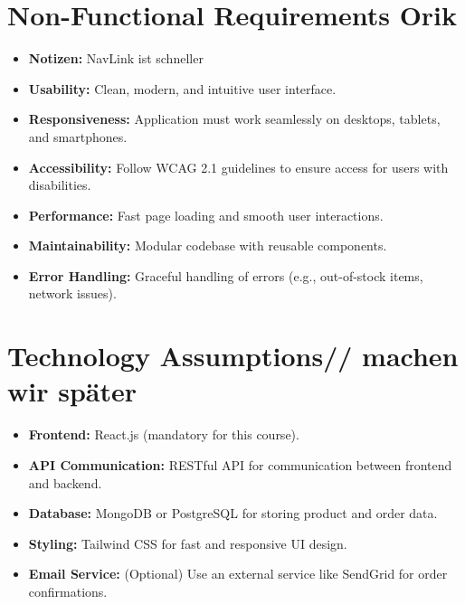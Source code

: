 \documentclass[a4paper,12pt]{article.cls}
\begin{document}
	\section{Non-Functional Requirements Orik}
	\begin{itemize}
			\item \textbf{Notizen:} NavLink ist schneller
		\item \textbf{Usability:} Clean, modern, and intuitive user interface.
		\item \textbf{Responsiveness:} Application must work seamlessly on desktops, tablets, and smartphones.
		\item \textbf{Accessibility:} Follow WCAG 2.1 guidelines to ensure access for users with disabilities.
		\item \textbf{Performance:} Fast page loading and smooth user interactions.
		\item \textbf{Maintainability:} Modular codebase with reusable components.
		\item \textbf{Error Handling:} Graceful handling of errors (e.g., out-of-stock items, network issues).
	\end{itemize}
	
	\section{Technology Assumptions// machen wir später}
	\begin{itemize}
		\item \textbf{Frontend:} React.js (mandatory for this course).
	
		\item \textbf{API Communication:} RESTful API for communication between frontend and backend.
		\item \textbf{Database:} MongoDB or PostgreSQL for storing product and order data.
		\item \textbf{Styling:} Tailwind CSS for fast and responsive UI design.
		\item \textbf{Email Service:} (Optional) Use an external service like SendGrid for order confirmations.
	\end{itemize}
	
\end{document}
